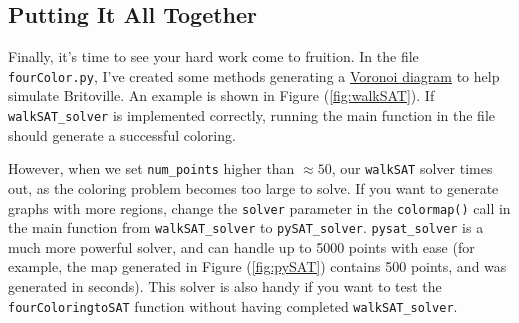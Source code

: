 \documentclass{article}
\begin{document}
\subsection*{Putting It All Together}
    Finally, it's time to see your hard work come to fruition. In the file \lstinline{fourColor.py}, I've created some methods generating a \href{https://en.wikipedia.org/wiki/Voronoi_diagram}{Voronoi diagram} to help simulate Britoville. An example is shown in Figure (\ref{fig:walkSAT}). If \lstinline{walkSAT_solver} is implemented correctly, running the main function in the file should generate a successful coloring.
    
    \vspace{2mm}
    However, when we set \lstinline{num_points} higher than $\approx 50$, our \lstinline{walkSAT} solver times out, as the coloring problem becomes too large to solve. If you want to generate graphs with more regions, change the \lstinline{solver} parameter in the \lstinline{colormap()} call in the main function from \lstinline{walkSAT_solver} to \lstinline{pySAT_solver}. \lstinline{pysat_solver} is a much more powerful solver, and can handle up to 5000 points with ease (for example, the map generated in Figure (\ref{fig:pySAT}) contains 500 points, and was generated in seconds). This solver is also handy if you want to test the \lstinline{fourColoringtoSAT} function without having completed \lstinline{walkSAT_solver}.
\end{document}
